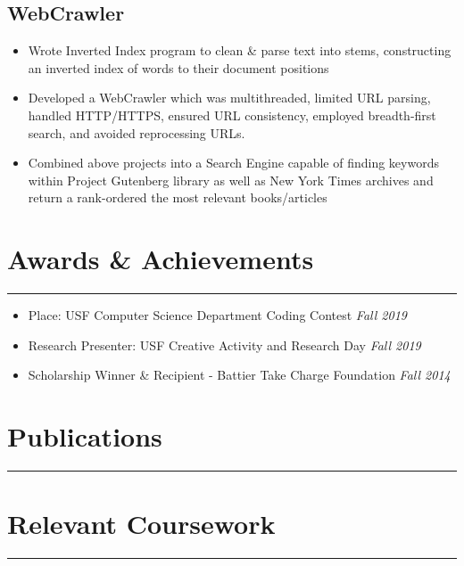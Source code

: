 \documentclass[11pt,a4paper]{article}
\newenvironment{myitemize}
{ \begin{itemize}[label={--}, leftmargin=*]
    \setlength{\itemsep}{0pt}
    \setlength{\parskip}{0pt}
    \setlength{\parsep}{0pt}     }
{ \end{itemize}                  }
\begin{document}
\subsection*{WebCrawler \hfill {} }

\begin{myitemize}
\item Wrote Inverted Index program to clean \& parse text into stems, constructing an inverted index of words to their document positions
\item Developed a WebCrawler which was multithreaded, limited URL parsing, handled HTTP/HTTPS, ensured URL consistency, employed breadth-first search, and avoided reprocessing URLs. 
\item Combined above projects into a Search Engine capable of finding keywords within Project Gutenberg library as well as New York Times archives and return a rank-ordered the most relevant books/articles
\end{myitemize}


\section*{Awards \& Achievements}
\vspace{-3mm} %
\hrule
\vspace{3mm} %

\begin{myitemize}
\item {} Place: USF Computer Science Department Coding Contest \hfill{\textit{Fall 2019} }
\item Research Presenter: USF Creative Activity and Research Day \hfill{\textit{Fall 2019} }
\item Scholarship Winner \& Recipient - Battier Take Charge Foundation \hfill{\textit{Fall 2014}}
\end{myitemize}

\section*{Publications}
\hrule
\vspace{6mm} %



\section*{Relevant Coursework}
\hrule
\end{document}
